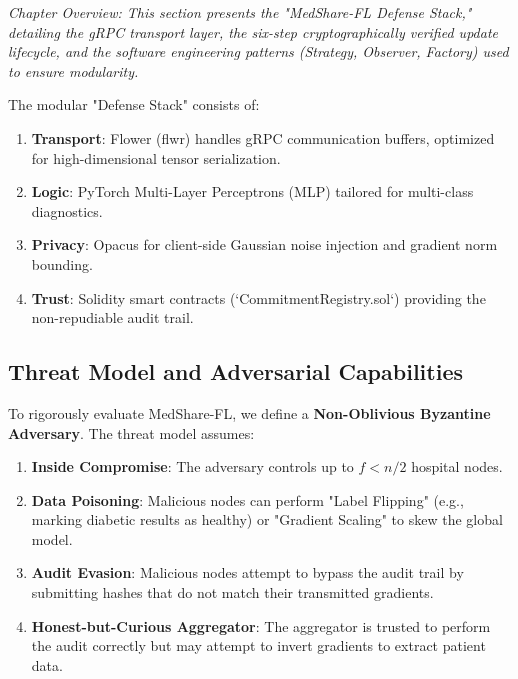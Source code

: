\documentclass[10pt, a4paper, twocolumn]{article}
\begin{document}
\textit{Chapter Overview: This section presents the "MedShare-FL Defense Stack," detailing the gRPC transport layer, the six-step cryptographically verified update lifecycle, and the software engineering patterns (Strategy, Observer, Factory) used to ensure modularity.}

The modular "Defense Stack" consists of:
\begin{enumerate}
    \item \textbf{Transport}: Flower (flwr) handles gRPC communication buffers, optimized for high-dimensional tensor serialization.
    \item \textbf{Logic}: PyTorch Multi-Layer Perceptrons (MLP) tailored for multi-class diagnostics.
    \item \textbf{Privacy}: Opacus for client-side Gaussian noise injection and gradient norm bounding.
    \item \textbf{Trust}: Solidity smart contracts (`CommitmentRegistry.sol`) providing the non-repudiable audit trail.
\end{enumerate}

\subsection{Threat Model and Adversarial Capabilities}
To rigorously evaluate MedShare-FL, we define a \textbf{Non-Oblivious Byzantine Adversary}. The threat model assumes:
\begin{enumerate}
    \item \textbf{Inside Compromise}: The adversary controls up to $f < n/2$ hospital nodes.
    \item \textbf{Data Poisoning}: Malicious nodes can perform "Label Flipping" (e.g., marking diabetic results as healthy) or "Gradient Scaling" to skew the global model.
    \item \textbf{Audit Evasion}: Malicious nodes attempt to bypass the audit trail by submitting hashes that do not match their transmitted gradients.
    \item \textbf{Honest-but-Curious Aggregator}: The aggregator is trusted to perform the audit correctly but may attempt to invert gradients to extract patient data.
\end{enumerate}
\end{document}
